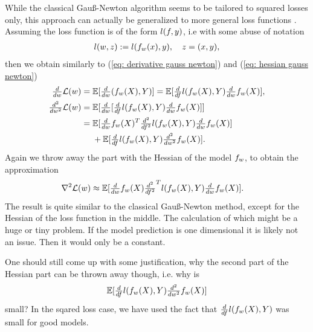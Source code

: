 While the classical Gauß-Newton algorithm seems to be tailored to squared losses
only, this approach can actually be generalized to more general loss functions
\parencite{schraudolphFastCurvatureMatrixVector2001}. Assuming the loss function
is of the form \(l(f,y)\), i.e with some abuse of notation
\begin{align*}
	l(w, z) := l(f_{w}(x), y), \quad z=(x,y),
\end{align*}
then we obtain similarly to (\ref{eq: derivative gauss newton}) and (\ref{eq:
hessian gauss newton})
\begin{align}
	\label{eq: derivative generalized gauss newton}
	\tfrac{d}{dw}\mathcal{L}(w)
	&= \mathbb{E}[\tfrac{d}{dw}(f_{w}(X), Y)]
	= \mathbb{E}[\tfrac{d}{df}l(f_{w}(X),Y)\tfrac{d}{dw}f_{w}(X)],\\
	\label{eq: hessian generalized gauss newton}
	\tfrac{d^2}{dw^2}\mathcal{L}(w)
	&=\mathbb{E}[\tfrac{d}{dw}[\tfrac{d}{df}l(f_{w}(X),Y)\tfrac{d}{dw}f_{w}(X)]]\\
	\nonumber
	&=\begin{aligned}[t]
		&\mathbb{E}[\tfrac{d}{dw}f_{w}(X)^T\tfrac{d^2}{df^2}l(f_{w}(X),Y)\tfrac{d}{dw}f_{w}(X)]\\
		&+ \mathbb{E}[\tfrac{d}{df}l(f_{w}(X),Y)\tfrac{d^2}{dw^2}f_{w}(X)].
	\end{aligned}
\end{align}
Again we throw away the part with the Hessian of the model \(f_{w}\),
to obtain the approximation
\begin{align*}
	\nabla^2\mathcal{L}(w)
	&\approx\mathbb{E}[\tfrac{d}{dw}f_{w}(X)\tfrac{d^2}{df^2}^Tl(f_{w}(X),Y)\tfrac{d}{dw}f_{w}(X)].
\end{align*}
The result is quite similar to the classical Gauß-Newton method, except for the
Hessian of the loss function in the middle. The calculation of which might be a
huge or tiny problem. If the model prediction is one dimensional it is likely
not an issue. Then it would only be a constant.

One should still come up with some justification, why the second part of the
Hessian part can be thrown away though, i.e. why is
\begin{align*}
	\mathbb{E}[\tfrac{d}{df}l(f_{w}(X),Y)\tfrac{d^2}{dw^2}f_{w}(X)]
\end{align*}
small? In the sqared loss case, we have used the fact that
\(\tfrac{d}{df}l(f_{w}(X),Y)\) was small for good models.

